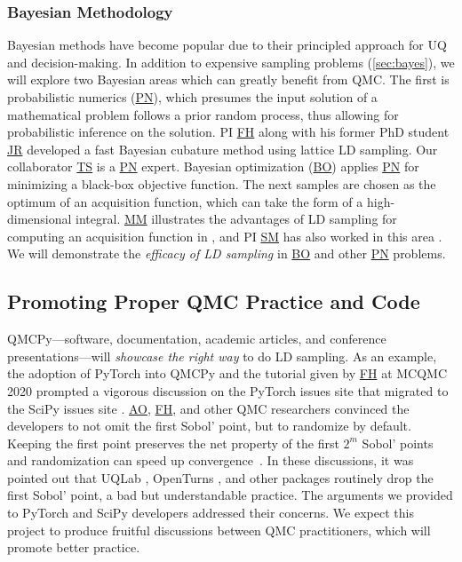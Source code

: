 \documentclass[11pt]{NSFamsart}
\newcommand{\FH}{\hyperlink{FHlink}{FH}\xspace}
\newcommand{\SM}{\hyperlink{SMlink}{SM}\xspace}
\newcommand{\AO}{\hyperlink{AOlink}{AO}\xspace}
\newcommand{\MM}{\hyperlink{MMlink}{MM}\xspace}
\newcommand{\TS}{\hyperlink{TSlink}{TS}\xspace}
\newcommand{\JR}{\hyperlink{JRlink}{JR}\xspace}
\newcommand{\PN}{\hyperlink{PNlink}{PN}\xspace}
\newcommand{\BO}{\hyperlink{BOlink}{BO}\xspace}
\newcommand{\SciPy}{SciPy\xspace}
\newcommand{\PyTorch}{PyTorch\xspace}
\begin{document}
\subsubsection{Bayesian Methodology} Bayesian methods have become popular due to their principled approach for UQ and decision-making. In addition to expensive sampling problems (\cref{sec:bayes}), we will explore two Bayesian areas which can greatly benefit from QMC. The first is \hypertarget{PNlink}{probabilistic numerics} (\PN), which presumes the input solution of a mathematical problem follows a prior random process, thus allowing for probabilistic inference on the solution. PI \FH along with his former PhD student \JR developed a fast Bayesian cubature method \cite{RatHic19a} using lattice LD sampling.  Our collaborator \TS is a \PN expert. \hypertarget{BOlink}{Bayesian optimization} (\BO) applies \PN for minimizing a black-box objective function.  The next samples are chosen as the optimum of an acquisition function, which can take the form of a high-dimensional integral.  \MM illustrates the advantages of LD sampling for computing an acquisition function in \cite[qEI with QMCPy]{QMCBlog}, and PI \SM has also worked in this area \cite{mak2019analysis,chen2019hierarchical}. We will demonstrate the \emph{efficacy of LD sampling} in \BO and other \PN problems.



\subsection{Promoting Proper QMC Practice and Code} \label{sec:goodpractice}
QMCPy---software, documentation, academic articles, and conference presentations---will \emph{showcase the right way} to do LD sampling.  As an example, the adoption of \PyTorch into QMCPy and the tutorial given by \FH at MCQMC 2020 \cite{MCQMC2020QMCPyTut, ChoEtal22a} prompted a vigorous discussion on the \PyTorch issues site \cite{PyTorchFirstPt2020a} that migrated to the \SciPy issues site \cite{scipySobol2020a}.  \AO, \FH, and other QMC researchers convinced the developers to not omit the first Sobol' point, but to randomize by default.  Keeping the first point preserves the net property of the first $2^m$ Sobol' points and randomization can speed up convergence~\cite{owen2020dropping}. In these discussions, it was pointed out that UQLab \cite{UQLab2014}, OpenTurns \cite{OpenTURNS}, and other packages routinely drop the first Sobol' point, a bad but understandable practice.  The arguments we provided to \PyTorch and \SciPy developers addressed their concerns.  We expect this project to produce fruitful discussions between QMC practitioners, which will promote better practice.
\end{document}
